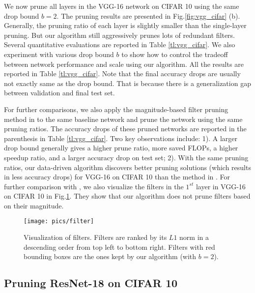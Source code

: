 \documentclass[10pt,twocolumn,letterpaper]{article}
\begin{document}
We now prune all layers in the VGG-16 network on CIFAR 10 using the same drop bound $b=2$. The pruning results are presented in Fig.\ref{fig:vgg_cifar} (b). Generally, the pruning ratio of each layer is slightly smaller than the single-layer pruning. But our algorithm still aggressively prunes lots of redundant filters. Several quantitative evaluations are reported in Table \ref{tl:vgg_cifar}. We also experiment with various drop bound $b$ to show how to control the tradeoff between network performance and scale using our algorithm. All the results are reported in Table \ref{tl:vgg_cifar}. Note that the final accuracy drops are usually not exactly same as the drop bound. That is because there is a generalization gap between validation and final test set.

For further comparisons, we also apply the magnitude-based filter pruning method in \cite{iclr17} to the same baseline network and prune the network using the same pruning ratios. The accuracy drops of these pruned networks are reported in the parenthesis in Table \ref{tl:vgg_cifar}. Two key observations include: 1). A larger drop bound generally gives a higher prune ratio, more saved FLOPs, a higher speedup ratio, and a larger accuracy drop on test set; 2). With the same pruning ratios, our data-driven algorithm discovers better pruning solutions (which results in less accuracy drops) for VGG-16 on CIFAR 10 than the method in \cite{iclr17}. For further comparison with \cite{iclr17}, we also visualize the filters in the $1^{st}$ layer in VGG-16 on CIFAR 10 in Fig.\ref{fig:filter}. They show that our algorithm does not prune filters based on their magnitude.





\begin{figure}
  \centering
  \captionsetup{justification=centering}
  \texttt{[image: pics/filter]}
\caption{Visualization of filters. Filters are ranked by its $L1$ norm in a descending order from top left to bottom right. Filters with red bounding boxes are the ones kept by our algorithm (with $b=2$).}
\label{fig:filter}
\end{figure}





\subsection{Pruning ResNet-18 on CIFAR 10}
\end{document}

